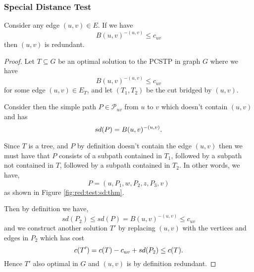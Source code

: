  \subsubsection{Special Distance Test}
 \label{sec:red:test:sd}
 \begin{theorem}
 Consider any edge $(u,v) \in E$. If we have
 $$B(u,v)^{-(u,v)} \leq c_{uv}$$
 then $(u,v)$ is redundant.
\end{theorem}
 \begin{proof}
   Let $T  \subseteq G$ be an optimal solution to the PCSTP in graph $G$
   where we have
   $$B(u,v)^{-(u,v)} \leq c_{uv}$$
   for some edge $(u,v) \in E_T$, and let $(T_1, T_2)$ be the cut bridged
   by $(u,v)$.

   Consider then the simple path $P \in \mathcal{P}_{uv}$ from $u$ to $v$ which doesn't
    contain $(u,v)$ and has
   $$sd(P) = B(u,v)^{-(u,v)}\mathnormal{.}$$

   Since $T$ is a tree, and $P$ by definition doesn't contain the edge $(u,v)$
   then we must have that $P$ consists of a subpath contained in $T_1$, followed by
   a subpath not contained in $T$, followed by a subpath contained in $T_2$.
   In other words, we have,
   $$P = (u, P_1, w, P_2, z, P_3, v)$$
   as shown in Figure \ref{fig:red:test:sd:thm}.

   Then by definition we have,
   $$sd(P_2) \leq sd(P) = B(u,v)^{-(u,v)} \leq c_{uv}$$
   and we construct another solution $T'$ by replacing $(u,v)$ with the
   vertices and edges in $P_2$ which has cost
   $$c(T') = c(T) - c_{uv} + sd(P_2) \leq c(T)\mathnormal{.}$$
   Hence $T'$ also optimal in $G$ and $(u,v)$ is by definition redundant.
\end{proof}
